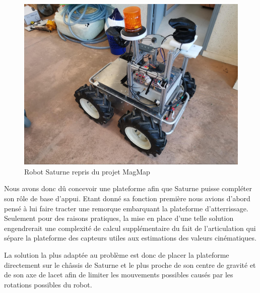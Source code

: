 \begin{figure}[H]
    \centering\includegraphics[width=150mm]{images/ugv/ugv1.jpg}
    \caption{Robot Saturne repris du projet MagMap}
\end{figure}

Nous avons donc dû concevoir une plateforme afin que Saturne puisse compléter son rôle de base d’appui. Etant donné sa fonction première nous avions d’abord pensé à lui faire tracter une remorque embarquant la plateforme d’atterrissage. Seulement pour des raisons pratiques, la mise en place d’une telle solution engendrerait une complexité de calcul supplémentaire du fait de l’articulation qui sépare la plateforme des capteurs utiles aux estimations des valeurs cinématiques.

La solution la plus adaptée au problème est donc de placer la plateforme directement sur le châssis de Saturne et le plus proche de son centre de gravité et de son axe de lacet afin de limiter les mouvements possibles causés par les rotations possibles du robot.

